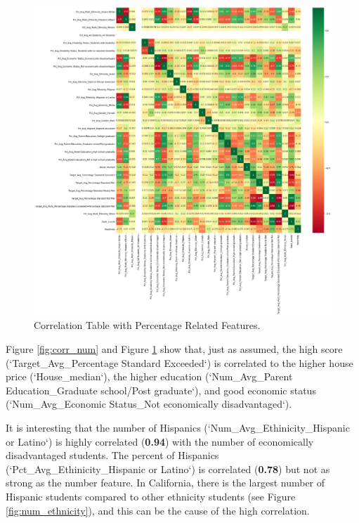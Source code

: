 \documentclass[11pt]{article}
\begin{document}
\begin{figure}[h!]
\centering 
\includegraphics[width=\textwidth]{output_85_0.png}
\caption{Correlation Table with Percentage Related Features.}
  \label{fig:corr_pct}
\end{figure}

Figure \ref{fig:corr_num} and Figure \ref{fig:corr_pct} show that, just as assumed, the high score (`Target\_Avg\_Percentage Standard Exceeded`) is correlated to the higher house price (`House\_median`), the higher education (`Num\_Avg\_Parent Education\_Graduate school/Post graduate`), and good economic status (`Num\_Avg\_Economic Status\_Not economically disadvantaged`).  

It is interesting that the number of Hispanics (`Num\_Avg\_Ethinicity\_Hispanic or Latino`) is highly correlated (\textbf{0.94}) with the number of economically disadvantaged students. The percent of Hispanics (`Pct\_Avg\_Ethinicity\_Hispanic or Latino`) is correlated (\textbf{0.78}) but not as strong as the number feature.
In California, there is the largest number of Hispanic students compared to other ethnicity students (see Figure \ref{fig:num_ethnicity}), and this can be the cause of the high correlation.
\end{document}
